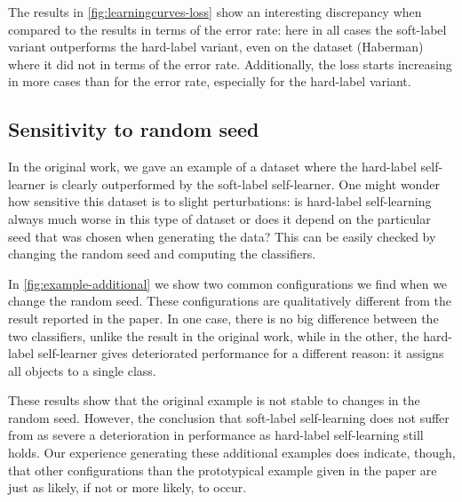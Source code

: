 \documentclass[runningheads,a4paper]{llncs}\usepackage[]{graphicx}\usepackage[]{color}
\begin{document}
The results in \cref{fig:learningcurves-loss} show an interesting discrepancy when compared to the results in terms of the error rate: here in all cases the soft-label variant outperforms the hard-label variant, even on the dataset (Haberman) where it did not in terms of the error rate. Additionally, the loss starts increasing in more cases than for the error rate, especially for the hard-label variant.

\subsection{Sensitivity to random seed}
In the original work, we gave an example of a dataset where the hard-label self-learner is clearly outperformed by the soft-label self-learner. One might wonder how sensitive this dataset is to slight perturbations: is hard-label self-learning always much worse in this type of dataset or does it depend on the particular seed that was chosen when generating the data? This can be easily checked by changing the random seed and computing the classifiers. 

In \cref{fig:example-additional} we show two common configurations we find when we change the random seed. These configurations are qualitatively different from the result reported in the paper. In one case, there is no big difference between the two classifiers, unlike the result in the original work, while in the other, the hard-label self-learner gives deteriorated performance for a different reason: it assigns all objects to a single class. 

These results show that the original example is not stable to changes in the random seed. However, the conclusion that soft-label self-learning does not suffer from as severe a deterioration in performance as hard-label self-learning still holds. Our experience generating these additional examples does indicate, though, that other configurations than the prototypical example given in the paper are just as likely, if not or more likely, to occur.
\end{document}
